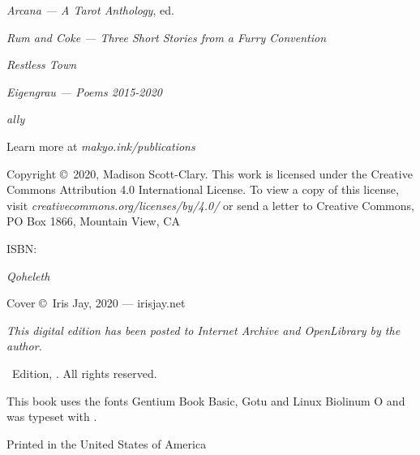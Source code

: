 \singlespacing
\thispagestyle{empty}
\null
\vfill
\begin{center}
    \TitleFamily

    \vspace{2ex}

    \emph{Arcana — A Tarot Anthology}, ed.

    \vspace{1ex}

    \emph{Rum and Coke — Three Short Stories from a Furry Convention}

    \vspace{1ex}

    \emph{Restless Town}

    \vspace{1ex}

    \emph{Eigengrau — Poems 2015-2020}

    \vspace{1ex}

    \emph{ally}

    \vspace{2em}

    Learn more at \emph{makyo.ink/publications}
\end{center}
\vfill
\singlespacing
{\small\parindent0pt\parskip5pt
\noindent Copyright \copyright\ 2020, Madison Scott-Clary. This work is licensed under the Creative Commons Attribution 4.0 International License. To view a copy of this license, visit \mbox{\emph{creativecommons.org/licenses/by/4.0/}} or send a letter to Creative Commons, PO Box 1866, Mountain View, CA

\vspace{1ex}

ISBN: \ISBN

\vspace{1ex}

\textit{Qoheleth}

\vspace{1ex}

Cover \copyright\ Iris Jay, 2020 --- irisjay.net

\vspace{1ex}

\textit{This digital edition has been posted to Internet Archive and OpenLibrary by the author.}

\Edition\ Edition, \Year. All rights reserved.

\vspace{1ex}

This book uses the fonts Gentium Book Basic, {\DisplayFont Gotu} and {\TitleFont Linux Biolinum O} and was typeset with {\XeLaTeX}.

Printed in the United States of America\\
}%

\clearpage
